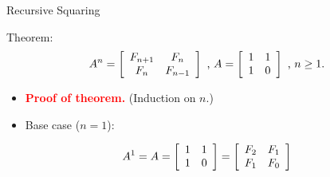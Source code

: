 \documentclass{beamer}
\begin{document}
\begin{frame}{Recursive Squaring}
    \begin{exampleblock}{Theorem:}
        $$
            A^n
            =
            \left[
                \begin{array}{c c}
                    F_{n + 1} & F_n \\
                    F_n       & F_{n - 1}
                \end{array}
            \right] \text{ , }
            A =
            \left[
                \begin{array}{c c}
                    1 & 1 \\
                    1 & 0
                \end{array}
            \right] \text{ , }
            n \geq 1\text{.}
        $$
    \end{exampleblock}
    \begin{itemize}
        \item[] \textbf{\textcolor{red}{Proof of theorem.}} (Induction on $n$.)
        \item[] Base case ($n = 1$):
    \end{itemize}
    \pause
    $$
        A^1
        =
        A
        =
        \left[
            \begin{array}{c c}
                1 & 1 \\
                1 & 0
            \end{array}
        \right]
        =
        \left[
            \begin{array}{c c}
                F_2 & F_1 \\
                F_1 & F_0
            \end{array}
        \right]
    $$
\end{frame}
\end{document}
